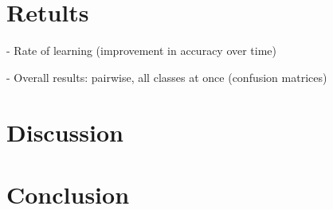 \documentclass[11pt]{article}
\begin{document}
\begin{multicols}{2}
\section{Retults}


- Rate of learning (improvement in accuracy over time)

- Overall results: pairwise, all classes at once (confusion matrices)









\section{Discussion}








\section{Conclusion}












\end{multicols}
\end{document}
